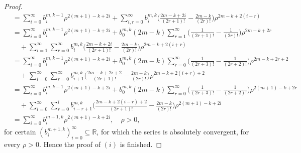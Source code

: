 \documentclass[a4paper,10pt, reqno]{amsart}
\theoremstyle{definition}
\theoremstyle{remark}
\numberwithin{equation}{section}
\begin{document}
{\begin{proof}
\begin{align*}
&=\sum_{i=0}^\infty b_i^{m,k-1}\rho ^{2(m+1)-k+2i}+\sum_{i,r=0}^\infty b_i^{m,k}\Big(\frac{2m-k+2i}{(2r+1)!}-\frac{2m-k}{(2r)!}\Big)\rho ^{2m-k+2(i+r)}\\
&=\sum_{i=0}^\infty b_i^{m,k-1}\rho ^{2(m+1)-k+2i}+b_0^{m,k}(2m-k)\sum_{r=1}^\infty  \Big(\frac{1}{(2r+1)!}-\frac{1}{(2r)!}\Big)\rho ^{2m-k+2r}\\
&\quad +\sum_{i=1}^\infty\sum_{r=0}^\infty b_i^{m,k}\Big(\frac{2m-k+2i}{(2r+1)!}-\frac{2m-k}{(2r)!}\Big)\rho ^{2m-k+2(i+r)}\\
&=\sum_{i=0}^\infty b_i^{m,k-1}\rho ^{2(m+1)-k+2i}+b_0^{m,k}(2m-k)\sum_{r=0}^\infty  \Big(\frac{1}{(2r+3)!}-\frac{1}{(2r+2)!}\Big)\rho ^{2m-k+2r+2}\\
&\quad +\sum_{i=0}^\infty\sum_{r=0}^\infty b_{i+1}^{m,k}\Big(\frac{2m-k+2i+2}{(2r+1)!}-\frac{2m-k}{(2r)!}\Big)\rho ^{2m-k+2(i+r)+2}\\
&=\sum_{i=0}^\infty b_i^{m,k-1}\rho ^{2(m+1)-k+2i}+b_0^{m,k}(2m-k)\sum_{r=0}^\infty  \Big(\frac{1}{(2r+3)!}-\frac{1}{(2r+2)!}\Big)\rho ^{2(m+1)-k+2r}\\
&\quad +\sum_{i=0}^\infty\sum_{r=0}^ib_{i-r+1}^{m,k}\Big(\frac{2m-k+2(i-r)+2}{(2r+1)!}-\frac{2m-k}{(2r)!}\Big)\rho ^{2(m+1)-k+2i}\\
&=\sum_{i=0}^\infty b_i^{m+1,k}\rho ^{2(m+1)-k+2i},\quad \rho >0,
\end{align*}
for certain $(b_i^{m+1,k})_{i=0}^\infty\subseteq \mathbb R$, for which  the series is absolutely convergent, for every $\rho >0$. Hence the proof of $(i)$ is finished.


\end{proof}}
\end{document}
